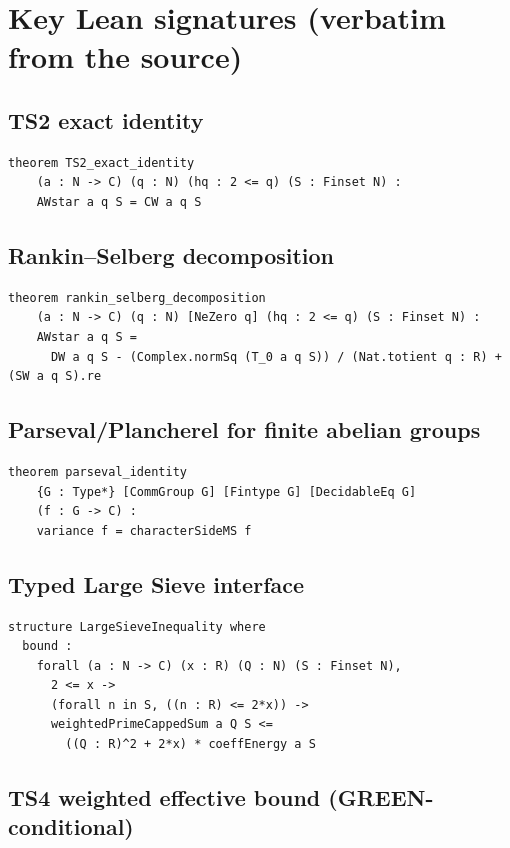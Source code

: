 \documentclass[11pt,a4paper]{article}
\theoremstyle{definition}
\begin{document}
\section{Key Lean signatures (verbatim from the source)}\label{app:lean}

\subsection{TS2 exact identity}

\begin{lstlisting}
theorem TS2_exact_identity
    (a : N -> C) (q : N) (hq : 2 <= q) (S : Finset N) :
    AWstar a q S = CW a q S
\end{lstlisting}

\subsection{Rankin--Selberg decomposition}

\begin{lstlisting}
theorem rankin_selberg_decomposition
    (a : N -> C) (q : N) [NeZero q] (hq : 2 <= q) (S : Finset N) :
    AWstar a q S =
      DW a q S - (Complex.normSq (T_0 a q S)) / (Nat.totient q : R) + (SW a q S).re
\end{lstlisting}

\subsection{Parseval/Plancherel for finite abelian groups}

\begin{lstlisting}
theorem parseval_identity
    {G : Type*} [CommGroup G] [Fintype G] [DecidableEq G]
    (f : G -> C) :
    variance f = characterSideMS f
\end{lstlisting}

\subsection{Typed Large Sieve interface}

\begin{lstlisting}
structure LargeSieveInequality where
  bound :
    forall (a : N -> C) (x : R) (Q : N) (S : Finset N),
      2 <= x ->
      (forall n in S, ((n : R) <= 2*x)) ->
      weightedPrimeCappedSum a Q S <=
        ((Q : R)^2 + 2*x) * coeffEnergy a S
\end{lstlisting}

\subsection{TS4 weighted effective bound (GREEN-conditional)}
\end{document}
